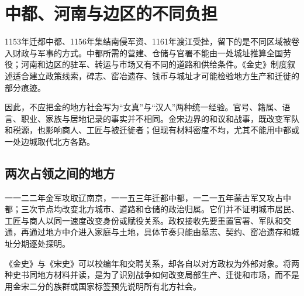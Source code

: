 \section{中都、河南与边区的不同负担}

1153年迁都中都、1156年集结南侵军资、1161年渡江受挫，留下的是不同区域被卷入财政与军事的方式。中都所需的营建、仓储与官署不能由一处城址推算全国劳役；河南和边区的驻军、转运与市场又有不同的道路和供给条件。《金史》制度叙述适合建立政策线索，碑志、窑冶遗存、钱币与城址才可能检验地方生产和迁徙的部分痕迹。

因此，不应把金的地方社会写为“女真”与“汉人”两种统一经验。官号、籍属、语言、职业、家族与居地记录的事实并不相同。金宋边界的和议和战事，既改变军队和税源，也影响商人、工匠与被迁徙者；但现有材料密度不均，尤其不能用中都或一处边城取代北方各路。

\subsection{两次占领之间的地方}

一一二二年金军攻取辽南京，一一五三年迁都中都，一二一五年蒙古军又攻占中都；三次节点均改变北方城市、道路和仓储的政治归属。它们并不证明城市居民、工匠与商人以同一速度改变身份或赋役关系。政权接收先要重置官署、军队和交通，再通过地方中介进入家庭与土地，具体节奏只能由墓志、契约、窑冶遗存和城址分期逐处探明。

《金史》与《宋史》可以校编年和交聘关系，却各自以对方政权为外部对象。将两种史书同地方材料并读，是为了识别战争如何改变局部生产、迁徙和市场，而不是用金宋二分的族群或国家标签预先说明所有北方社会。
